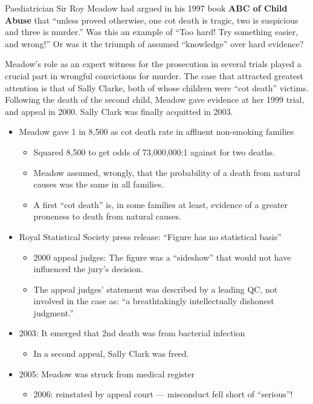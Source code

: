 \documentclass[
  10pt,
  b5paper]{book}
\providecommand{\tightlist}{%
  \setlength{\itemsep}{0pt}\setlength{\parskip}{0pt}}
\begin{document}
Paediatrician Sir Roy Meadow had argued in his 1997 book
\textbf{ABC of Child Abuse} that ``unless proved otherwise,
one cot death is tragic, two is suspicious and three is murder.''
Was this an example of ``Too hard! Try something easier, and wrong!''
Or was it the triumph of assumed ``knowledge'' over hard evidence?

Meadow's role as an expert witness for the prosecution in several
trials played a crucial part in wrongful convictions for murder.
The case that attracted greatest attention is that of Sally Clarke,
both of whose children were ``cot death'' victims. Following the
death of the second child, Meadow gave evidence at her 1999 trial,
and appeal in 2000. Sally Clark was finally acquitted in 2003.

\begin{itemize}
\tightlist
\item
  Meadow gave 1 in 8,500 as cot death rate in affluent non-smoking families

  \begin{itemize}
  \tightlist
  \item
    Squared 8,500 to get odds of 73,000,000:1 against for two deaths.
  \item
    Meadow assumed, wrongly, that the probability of a death from
    natural causes was the same in all families.
  \item
    A first ``cot death'' is, in some families at least, evidence of a greater
    proneness to death from natural causes.
  \end{itemize}
\item
  Royal Statistical Society press release: ``Figure has no statistical basis''

  \begin{itemize}
  \tightlist
  \item
    2000 appeal judges: The figure was a
    ``sideshow'' that would not have influenced the jury's decision.
  \item
    The appeal judges' statement was described by a leading QC, not
    involved in the case as: ``a breathtakingly intellectually dishonest
    judgment.''
  \end{itemize}
\item
  2003: It emerged that 2nd death was from bacterial infection

  \begin{itemize}
  \tightlist
  \item
    In a second appeal, Sally Clark was freed.
  \end{itemize}
\item
  2005: Meadow was struck from medical register

  \begin{itemize}
  \tightlist
  \item
    2006: reinstated by appeal court --- misconduct fell short
    of ``serious''!
  \end{itemize}
\end{itemize}
\end{document}
